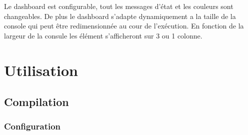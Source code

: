 \documentclass[article, backcover, french, nodocumentinfo]{upmethodology-document}
\begin{document}
					Le dashboard est configurable, tout les messages d'état et les couleurs sont changeables. De plus le dashboard s'adapte dynamiquement a la taille de la console qui peut être redimensionnée au cour de l’exécution. En fonction de la largeur de la consule les élément s’afficheront sur 3 ou 1 colonne.
	\section{Utilisation}
		\subsection{Compilation}
			\subsubsection{Configuration}
\end{document}
